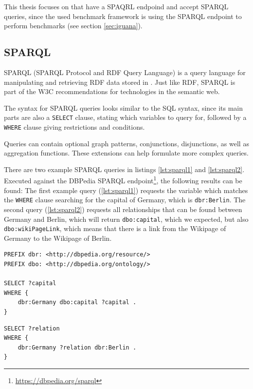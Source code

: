 This thesis focuses on \tsp{} that have a SPAQRL endpoind and accept SPARQL queries, since the used benchmark framework \iguana{} is using the SPARQL endpoint to perform benchmarks (see section \ref{sec:iguana}).


\subsection{SPARQL}
\label{sec:sparql}
SPARQL (SPARQL Protocol and RDF Query Language) \cite{harrisSPARQLQueryLanguage} is a query language for manipulating and retrieving RDF data stored in \tsp{}.
Just like RDF, SPARQL is part of the W3C recommendations for technologies in the semantic web.

The syntax for SPARQL queries looks similar to the SQL syntax, since its main parts are also a \texttt{SELECT} clause, stating which variables to query for, followed by a \texttt{WHERE} clause giving restrictions and conditions.

Queries can contain optional graph patterns, conjunctions, disjunctions, as well as aggregation functions.
These extensions can help formulate more complex queries.

There are two example SPARQL queries in listings \ref{lst:sparql1} and \ref{lst:sparql2}.
Executed against the DBPedia SPARQL endpoint\footnote{\url{https://dbpedia.org/sparql}}, the following results can be found:
The first example query (\ref{lst:sparql1}) requests the variable which matches the \texttt{WHERE} clause searching for the capital of Germany, which is \texttt{dbr:Berlin}.
The second query (\ref{lst:sparql2}) requests all relationships that can be found between Germany and Berlin, which will return \texttt{dbo:capital}, which we expected, but also \texttt{dbo:wikiPageLink}, which means that there is a link from the Wikipage of Germany to the Wikipage of Berlin.

\begin{lstlisting}[caption={SPARQL query searching the capital of Germany}, label=lst:sparql1]
PREFIX dbr: <http://dbpedia.org/resource/>
PREFIX dbo: <http://dbpedia.org/ontology/>

SELECT ?capital
WHERE {
	dbr:Germany dbo:capital ?capital .
}
\end{lstlisting}

\begin{lstlisting}[caption={SPARQL query searching all relations between Germany and Berlin}, label=lst:sparql2]
SELECT ?relation
WHERE {
	dbr:Germany ?relation dbr:Berlin .
}
\end{lstlisting}